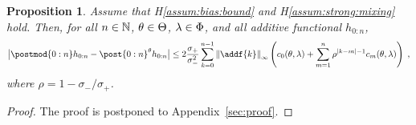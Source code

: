 \documentclass{article}
\newtheorem{proposition}[theorem]{Proposition}
\begin{document}
\begin{proposition}
\label{prop:bias}
Assume that H\ref{assum:bias:bound} and H\ref{assum:strong:mixing} hold. Then, for all $n \in \mathbb{N}$, $\theta\in\Theta$, $\lambda\in\Phi$, and all additive functional $h_{0:n}$,  
$$
        \big| \postmod{0:n} h_{0:n} -  \post{0:n}^{\parvec} h_{0:n} \big| 
        \leq 2\frac{\sigma_+}{\sigma_-^2}\sum_{k=0}^{n-1}\left\| \addf{k}\right\|_\infty\left( c_0(\parvec,\parvar) + \sum_{m=1}^n \rho^{|k-m|-1}c_m(\parvec,\parvar)\right)\eqsp,%
$$
where $\rho = 1-\sigma_-/\sigma_+$.
\end{proposition}

\begin{proof}
The proof is postponed to Appendix~\ref{sec:proof}.
\end{proof}
\end{document}
